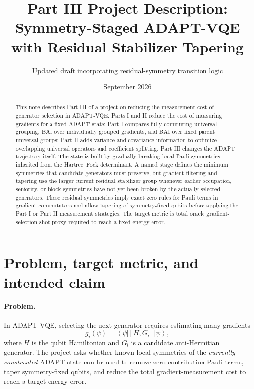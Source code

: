 \documentclass[11pt]{article}
\title{Part III Project Description: Symmetry-Staged ADAPT-VQE with Residual Stabilizer Tapering}
\author{Updated draft incorporating residual-symmetry transition logic}
\date{September 2026}
\newcommand{\ket}[1]{\left|#1\right\rangle}
\newcommand{\bra}[1]{\left\langle#1\right|}
\newcommand{\comm}[2]{\left[#1,#2\right]}
\begin{document}
\maketitle

\begin{abstract}
This note describes Part III of a project on reducing the measurement cost of generator selection in ADAPT-VQE. Parts I and II reduce the cost of measuring gradients for a fixed ADAPT state: Part I compares fully commuting universal grouping, BAI over individually grouped gradients, and BAI over fixed parent universal groups; Part II adds variance and covariance information to optimize overlapping universal operators and coefficient splitting. Part III changes the ADAPT trajectory itself. The state is built by gradually breaking local Pauli symmetries inherited from the Hartree--Fock determinant. A named stage defines the minimum symmetries that candidate generators must preserve, but gradient filtering and tapering use the larger current residual stabilizer group whenever earlier occupation, seniority, or block symmetries have not yet been broken by the actually selected generators. These residual symmetries imply exact zero rules for Pauli terms in gradient commutators and allow tapering of symmetry-fixed qubits before applying the Part I or Part II measurement strategies. The target metric is total oracle gradient-selection shot proxy required to reach a fixed energy error.
\end{abstract}

\section{Problem, target metric, and intended claim}

\paragraph{Problem.}
In ADAPT-VQE, selecting the next generator requires estimating many gradients
\begin{equation}
    g_i(\psi) = \bra{\psi}\comm{H}{G_i}\ket{\psi},
\end{equation}
where $H$ is the qubit Hamiltonian and $G_i$ is a candidate anti-Hermitian generator. The project asks whether known local symmetries of the \emph{currently constructed} ADAPT state can be used to remove zero-contribution Pauli terms, taper symmetry-fixed qubits, and reduce the total gradient-measurement cost to reach a target energy error.
\end{document}

